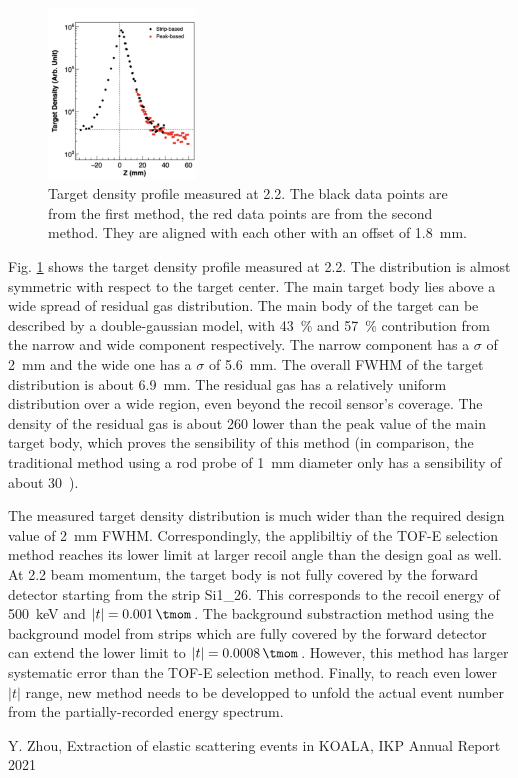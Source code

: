 \documentclass[fleqn,twocolumn,a4paper]{ikpar}
\begin{document}
\begin{figure}[htbp]
  \centering
	\includegraphics[width=0.35\textwidth]{./target_density_result.png}
  \caption{Target density profile measured at \SI{2.2}{\momentum}. The black
    data points are from the first method, the red data points are from the
    second method. They are aligned with each other with an offset of \SI{1.8}{\mm}.}
  \label{fig:target_density_result}
\end{figure}

\par
\medskip

Fig. \ref{fig:target_density_result} shows the target density profile measured at
\SI{2.2}{\momentum}.
The distribution is almost symmetric with respect to the target center.
The main target body lies above a wide spread of residual gas distribution.
The main body of the target can be described by a double-gaussian model, with
\SI{43}{\percent} and \SI{57}{\percent} contribution from the narrow and wide
component respectively.
The narrow component has a $\sigma$ of \SI{2}{mm} and the wide one has a $\sigma$ of \SI{5.6}{mm}.
The overall FWHM of the target distribution is about \SI{6.9}{mm}.
The residual gas has a relatively uniform distribution over a wide region, even
beyond the recoil sensor's coverage.
The density of the residual gas is about 260 lower than the peak value of the
main target body, which proves the sensibility of this method (in comparison, the traditional
method using a rod probe of \SI{1}{\mm} diameter only has a sensibility of about
\SI{30}).

\par
\medskip

The measured target density distribution is much wider than the required design value
of \SI{2}{\mm} FWHM.
Correspondingly, the applibiltiy of the TOF-E selection method reaches its lower
limit at larger recoil angle than the design goal as well.
At \SI{2.2}{\momentum} beam momentum, the target body is not fully covered by
the forward detector starting from the strip Si1\_26.
This corresponds to the recoil energy of \SI{500}{\keV} and $|t| = \SI{0.001}{\tmom}$.
The background substraction method using the background model from strips which
are fully covered by the forward detector can extend the lower limit to $|t| = \SI{0.0008}{\tmom}$.
However, this method has larger systematic error than the TOF-E selection method.
Finally, to reach even lower $|t|$ range, new method needs to be developped to unfold the
actual event number from the partially-recorded energy spectrum.

\par
\medskip

\begin{thebibliography}{99}
 Y. Zhou, Extraction of elastic scattering events in KOALA, IKP Annual Report 2021
\end{thebibliography}
\end{document}
